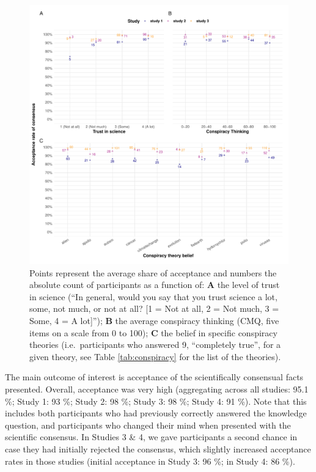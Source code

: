 \documentclass[
  doc,floatsintext]{apa6}
\begin{document}
\begin{figure}
\centering
\includegraphics{output/figures/summary-plot.pdf}
\caption{\label{fig:summary-plot}Points represent the average share of acceptance and numbers the absolute count of participants as a function of: \textbf{A} the level of trust in science (``In general, would you say that you trust science a lot, some, not much, or not at all? {[}1 = Not at all, 2 = Not much, 3 = Some, 4 = A lot{]}''); \textbf{B} the average conspiracy thinking (CMQ, five items on a scale from 0 to 100); \textbf{C} the belief in specific conspiracy theories (i.e.~participants who answered 9, ``completely true'', for a given theory, see Table \ref{tab:conspiracy} for the list of the theories).}
\end{figure}

The main outcome of interest is acceptance of the scientifically consensual facts presented. Overall, acceptance was very high (aggregating across all studies: 95.1 \%; Study 1: 93 \%; Study 2: 98 \%; Study 3: 98 \%; Study 4: 91 \%). Note that this includes both participants who had previously correctly answered the knowledge question, and participants who changed their mind when presented with the scientific consensus. In Studies 3 \& 4, we gave participants a second chance in case they had initially rejected the consensus, which slightly increased acceptance rates in those studies (initial acceptance in Study 3: 96 \%; in Study 4: 86 \%).
\end{document}
